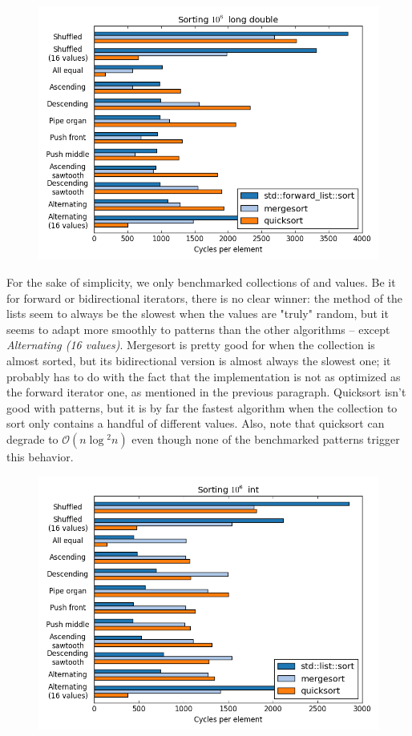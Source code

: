\documentclass{isocpp_proposal}
\begin{document}
\begin{appendices}
\begin{figure}[h]
\includegraphics[width=\textwidth]{forward-list-long-double.png}
\end{figure}

For the sake of simplicity, we only benchmarked collections of  and  values. Be it for forward or bidirectional iterators, there is no clear winner: the  method of the lists seem to always be the slowest when the values are "truly" random, but it seems to adapt more smoothly to patterns than the other algorithms -- except \emph{Alternating (16 values)}. Mergesort is pretty good for  when the collection is almost sorted, but its bidirectional version is almost always the slowest one; it probably has to do with the fact that the implementation is not as optimized as the forward iterator one, as mentioned in the previous paragraph. Quicksort isn't good with patterns, but it is by far the fastest algorithm when the collection to sort only contains a handful of different values. Also, note that quicksort can degrade to $\mathcal{O}(n \log{}^2 n)$ even though none of the benchmarked patterns trigger this behavior.

\newpage

\begin{figure}[h]
\includegraphics[width=\textwidth]{list-int.png}
\end{figure}


\end{appendices}
\end{document}
